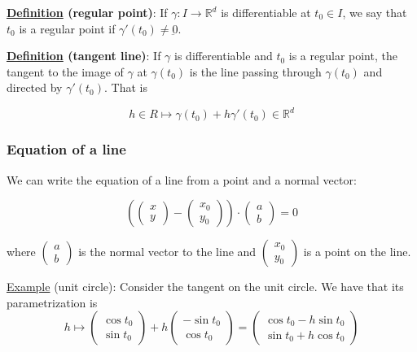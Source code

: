 \documentclass[10pt]{extarticle}
\newcommand{\R}{\mathbb{R}}
\begin{document}
\textbf{\underline{Definition} (regular point)}:
If $\gamma: I \to \R^d$ is differentiable at $t_0 \in I$, we say that $t_0$ is a regular point if $\gamma'(t_0) \neq \underbar{0}$.

\textbf{\underline{Definition} (tangent line)}:
If $\gamma$ is differentiable and $t_0$ is a regular point, the tangent to the image of $\gamma$ at $\gamma(t_0)$ is the line passing through $\gamma(t_0)$ and directed by $\gamma'(t_0)$.
That is

$$
    h \in R \mapsto \gamma(t_0) + h \gamma'(t_0) \in \R^d
$$

\subsubsection{Equation of a line}

We can write the equation of a line from a point and a normal vector:

$$
    \left(
    \begin{pmatrix}
            x \\ y
        \end{pmatrix} - \begin{pmatrix}
            x_0 \\ y_0
        \end{pmatrix}
    \right) \cdot \begin{pmatrix}
        a \\ b
    \end{pmatrix} = 0
$$

where $\begin{pmatrix}
        a \\ b
    \end{pmatrix}$ is the normal vector to the line and $\begin{pmatrix}
        x_0 \\ y_0
    \end{pmatrix}$ is a point on the line.


\underline{Example} (unit circle):
Consider the tangent on the unit circle. We have that its parametrization is
$$
    h \mapsto \begin{pmatrix}
        \cos t_0 \\ \sin t_0
    \end{pmatrix} + h \begin{pmatrix}
        -\sin t_0 \\ \cos t_0
    \end{pmatrix} =
    \begin{pmatrix}
        \cos t_0 - h \sin t_0 \\
        \sin t_0 + h \cos t_0
    \end{pmatrix}
$$
\end{document}

